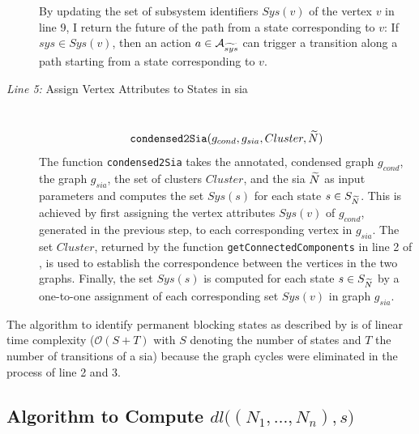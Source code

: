 \begin{description}
        By updating the set of subsystem identifiers $Sys(v)$ of the vertex $v$ in line 9, I return the future of the path from a state corresponding to $v$:
        If $sys \in Sys(v)$, then an action $a \in \mathcal{A}_{\widetilde{sys}}$ can trigger a transition along a path starting from a state corresponding to $v$.
    \item[{\normalfont \emph{Line 5:}} Assign Vertex Attributes to States in \gls{sia}] \hfill \\
        $$\textnormal{\tt condensed2Sia}( g_{cond}, g_{sia}, Cluster, \widetilde{N} )$$
        The function \texttt{condensed2Sia} takes the annotated, condensed graph $g_{cond}$, the graph $g_{sia}$, the set of clusters $Cluster$, and the \gls{sia} $\widetilde{N}$ as input parameters and computes the set $Sys(s)$ for each state $s \in S_{\widetilde{N}}$.
        This is achieved by first assigning the vertex attributes $\mathit{Sys(v)}$ of $g_{cond}$, generated in the previous step, to each corresponding vertex in $g_{sia}$.
        The set $Cluster$, returned by the function \texttt{getConnectedComponents} in line 2 of \Alg{\ref{alg_blocking}}, is used to establish the correspondence between the vertices in the two graphs.
        Finally, the set $Sys(s)$ is computed for each state $s \in S_{\widetilde{N}}$ by a one-to-one assignment of each corresponding set $Sys(v)$ in graph $g_{sia}$.
\end{description}

The algorithm to identify permanent blocking states as described by \Alg{\ref{alg_blocking}} is of linear time complexity ($\mathcal{O}(S+T)$ with $S$ denoting the number of states and $T$ the number of transitions of a \gls{sia}) because the graph cycles were eliminated in the process of line 2 and 3.

\subsection{Algorithm to Compute \texorpdfstring{$\mathit{dl} \big ( (N_1, \dots, N_n), s \big )$}{the Set of Deadlocking Subsystems}}
\label{sect_block_dl_alg}

